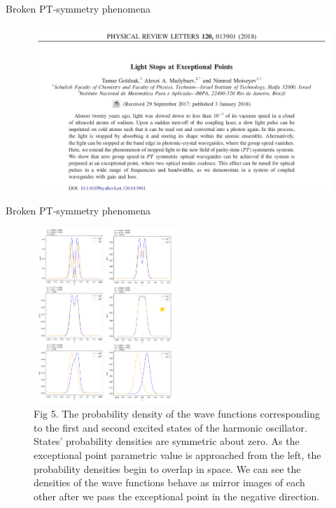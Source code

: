 \documentclass[10pt]{beamer}
\begin{document}
\begin{frame}{Broken PT-symmetry phenomena}
\begin{figure}
    \hspace{-4.5em}
    \includegraphics[width=\textwidth]{lightstops.png}
    \\
    \tiny{}
    \end{figure}
\end{frame}

\begin{frame}{Broken PT-symmetry phenomena}
\begin{figure}
    \hspace{-4.5em}
    \includegraphics[width=0.5\textwidth]{amplitudes.pdf}
    \\
    \tiny{Fig 5. The probability density of the wave functions corresponding to the first and second excited states of the harmonic oscillator. States' probability densities are symmetric about zero. As the exceptional point parametric value is approached from the left, the probability densities begin to overlap in space. We can see the densities of the wave functions behave as mirror images of each other after we pass the exceptional point in the negative direction.}
    \end{figure}
\end{frame}
\end{document}
